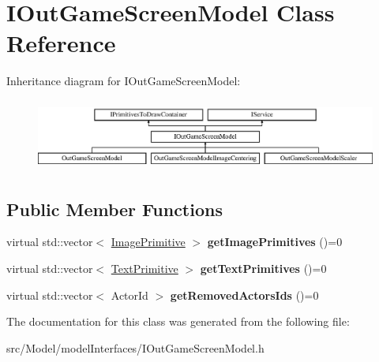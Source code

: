 \hypertarget{classIOutGameScreenModel}{}\section{I\+Out\+Game\+Screen\+Model Class Reference}
\label{classIOutGameScreenModel}
Inheritance diagram for I\+Out\+Game\+Screen\+Model\+:\begin{figure}[H]
\begin{center}
\leavevmode
\includegraphics[height=2.372881cm]{classIOutGameScreenModel}
\end{center}
\end{figure}
\subsection*{Public Member Functions}
\begin{DoxyCompactItemize}
\item 
virtual std\+::vector$<$ \hyperlink{classImagePrimitive}{Image\+Primitive} $>$ {\bfseries get\+Image\+Primitives} ()=0\hypertarget{classIOutGameScreenModel_ab1ebad0e5256f3d69b23c85a3b7eb234}{}\label{classIOutGameScreenModel_ab1ebad0e5256f3d69b23c85a3b7eb234}

\item 
virtual std\+::vector$<$ \hyperlink{classTextPrimitive}{Text\+Primitive} $>$ {\bfseries get\+Text\+Primitives} ()=0\hypertarget{classIOutGameScreenModel_aa319d5fd9bfba0a7917d242b40dacbe6}{}\label{classIOutGameScreenModel_aa319d5fd9bfba0a7917d242b40dacbe6}

\item 
virtual std\+::vector$<$ Actor\+Id $>$ {\bfseries get\+Removed\+Actors\+Ids} ()=0\hypertarget{classIOutGameScreenModel_a9a1993a660d847ae231b4050f00c819d}{}\label{classIOutGameScreenModel_a9a1993a660d847ae231b4050f00c819d}

\end{DoxyCompactItemize}


The documentation for this class was generated from the following file\+:\begin{DoxyCompactItemize}
\item 
src/\+Model/model\+Interfaces/I\+Out\+Game\+Screen\+Model.\+h\end{DoxyCompactItemize}
